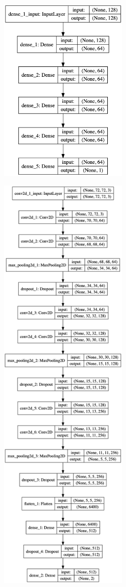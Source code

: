 \documentclass{article}
\begin{document}
\begin{minipage}{0.5\linewidth}
 \label{fig: nn_model}
\centering
\includegraphics[width=2.5in]{../output/nn_model.png}
\end{minipage}
\begin{minipage}{0.5\linewidth}
 \label{fig: cnn_model}
\centering
\includegraphics[width=2.5in]{../output/cnn_model.png}
\end{minipage}
\vspace*{10pt}
\end{document}
